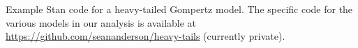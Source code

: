 \documentclass[12pt]{article}
\begin{document}
%
%


\clearpage

\noindent
Example Stan code for a heavy-tailed Gompertz model. The specific code for
the various models in our analysis is available at
\url{https://github.com/seananderson/heavy-tails} (currently private).

\end{document}
